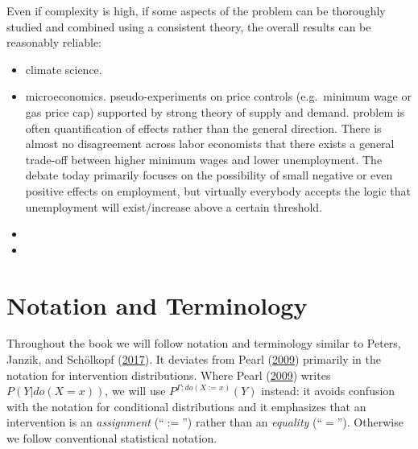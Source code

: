\documentclass[
]{book}
\theoremstyle{definition}
\theoremstyle{definition}
\theoremstyle{definition}
\theoremstyle{remark}
\begin{document}
Even if complexity is high, if some aspects of the problem can be thoroughly studied and combined using a consistent theory, the overall results can be reasonably reliable:

\begin{itemize}
\item
  climate science.
\item
  microeconomics. pseudo-experiments on price controls (e.g.~minimum wage or gas price cap) supported by strong theory of supply and demand. problem is often quantification of effects rather than the general direction. There is almost no disagreement across labor economists that there exists a general trade-off between higher minimum wages and lower unemployment. The debate today primarily focuses on the possibility of small negative or even positive effects on employment, but virtually everybody accepts the logic that unemployment will exist/increase above a certain threshold.
\item
\item
\end{itemize}

\hypertarget{appendix-appendix}{%
\appendix}


\hypertarget{notation-and-terminology}{%
\chapter{Notation and Terminology}\label{notation-and-terminology}}

Throughout the book we will follow notation and terminology similar to Peters, Janzik, and Schölkopf (\protect\hyperlink{ref-peters2017}{2017}). It deviates from Pearl (\protect\hyperlink{ref-pearl2009}{2009}) primarily in the notation for intervention distributions. Where Pearl (\protect\hyperlink{ref-pearl2009}{2009}) writes \(P(Y|do(X = x))\), we will use \(P^{\Gamma;do(X:=x)}(Y)\) instead: it avoids confusion with the notation for conditional distributions and it emphasizes that an intervention is an \emph{assignment} (``\(:=\)'') rather than an \emph{equality} (``\(=\)''). Otherwise we follow conventional statistical notation.
\end{document}
